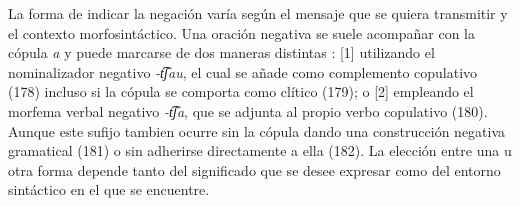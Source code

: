 La forma de indicar la negación varía según el mensaje que se quiera transmitir y el contexto morfosintáctico. Una oración negativa se suele acompañar con la cópula {\setmainfont{Charis SIL} \textit{a}} y puede marcarse de dos maneras distintas \textcolor{MidnightBlue}{\citep{wampis}}: [1] utilizando el nominalizador negativo {\setmainfont{Charis SIL} \textit{-t͡ʃau}}, el cual se añade como complemento copulativo (178) incluso si la cópula se comporta como clítico (179); o [2] empleando el morfema verbal negativo {\setmainfont{Charis SIL} \textit{-t͡ʃa}}, que se adjunta al propio verbo copulativo (180). Aunque este sufijo tambien ocurre sin la cópula dando una construcción negativa gramatical (181) o sin adherirse directamente a ella (182). La elección entre una u otra forma depende tanto del significado que se desee expresar como del entorno sintáctico en el que se encuentre.